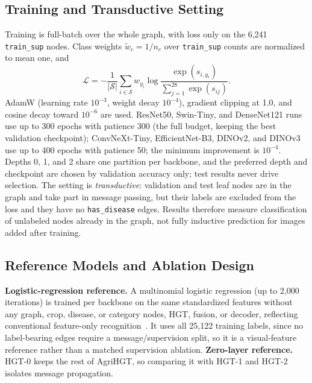 \documentclass[conference]{IEEEtran}
\begin{document}
\subsection{Training and Transductive Setting}
\label{sec:model_training}
Training is full-batch over the whole graph, with loss only on the 6,241 \texttt{train\_sup} nodes. Class weights $\tilde{w}_c = 1/n_c$ over \texttt{train\_sup} counts are normalized to mean one, and
\begin{equation}
\mathcal{L} = -\frac{1}{|\mathcal{S}|}\sum_{i\in\mathcal{S}} w_{y_i}\log\frac{\exp(s_{i,y_i})}{\sum_{j=1}^{28}\exp(s_{ij})}.
\label{eq:loss}
\end{equation}
AdamW (learning rate $10^{-3}$, weight decay $10^{-4}$), gradient clipping at 1.0, and cosine decay toward $10^{-6}$ are used. ResNet50, Swin-Tiny, and DenseNet121 runs use up to 300 epochs with patience 300 (the full budget, keeping the best validation checkpoint); ConvNeXt-Tiny, EfficientNet-B3, DINOv2, and DINOv3 use up to 400 epochs with patience 50; the minimum improvement is $10^{-4}$. Depths 0, 1, and 2 share one partition per backbone, and the preferred depth and checkpoint are chosen by validation accuracy only; test results never drive selection. The setting is \emph{transductive}: validation and test leaf nodes are in the graph and take part in message passing, but their labels are excluded from the loss and they have no \texttt{has\_disease} edges. Results therefore measure classification of unlabeled nodes already in the graph, not fully inductive prediction for images added after training.

\subsection{Reference Models and Ablation Design}
\label{sec:reference_ablation}
\textbf{Logistic-regression reference.} A multinomial logistic regression (up to 2,000 iterations) is trained per backbone on the same standardized features without any graph, crop, disease, or category nodes, HGT, fusion, or decoder, reflecting conventional feature-only recognition~\cite{ferentinos2018deep,srivastava2021plant}. It uses all 25,122 training labels, since no label-bearing edges require a message/supervision split, so it is a visual-feature reference rather than a matched supervision ablation. \textbf{Zero-layer reference.} HGT-0 keeps the rest of AgriHGT, so comparing it with HGT-1 and HGT-2 isolates message propagation.
\end{document}
